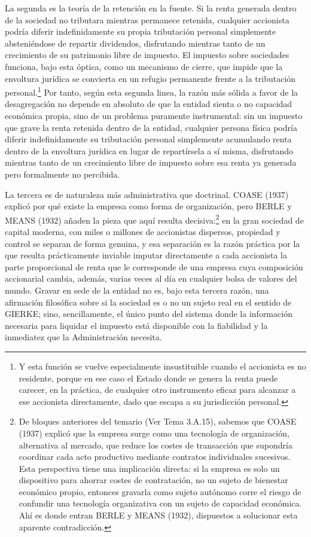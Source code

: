 \documentclass[10pt,a4paper]{article}
\newcommand{\authorfont}[1]{{\fontfamily{EBGaramond-TLF}\selectfont #1}}
\begin{document}
La segunda es la teoría de la retención en la fuente. Si la renta generada dentro de la sociedad no tributara mientras permanece retenida, cualquier accionista podría diferir indefinidamente su propia tributación personal simplemente absteniéndose de repartir dividendos, disfrutando mientras tanto de un crecimiento de su patrimonio libre de impuesto. El impuesto sobre sociedades funciona, bajo esta óptica, como un mecanismo de cierre, que impide que la envoltura jurídica se convierta en un refugio permanente frente a la tributación personal.\footnote{%
    Y esta función se vuelve especialmente insustituible cuando el accionista es no residente, porque en ese caso el Estado donde se genera la renta puede carecer, en la práctica, de cualquier otro instrumento eficaz para alcanzar a ese accionista directamente, dado que escapa a su jurisdicción personal.
} Por tanto, según esta segunda linea, la razón más sólida a favor de la desagregación no depende en absoluto de que la entidad sienta o no capacidad económica propia, sino de un problema puramente instrumental: sin un impuesto que grave la renta retenida dentro de la entidad, cualquier persona física podría diferir indefinidamente su tributación personal simplemente acumulando renta dentro de la envoltura jurídica en lugar de repartírsela a sí misma, disfrutando mientras tanto de un crecimiento libre de impuesto sobre esa renta ya generada pero formalmente no percibida.

La tercera es de naturaleza más administrativa que doctrinal. COASE (1937) explicó por qué existe la empresa como forma de organización, pero BERLE y MEANS (1932) añaden la pieza que aquí resulta decisiva:\footnote{%
    De bloques anteriores del temario (\authorfont{Ver Tema 3.A.15}), sabemos que COASE (1937) explicó que la empresa surge como una tecnología de organización, alternativa al mercado, que reduce los costes de transacción que supondría coordinar cada acto productivo mediante contratos individuales sucesivos. Esta perspectiva tiene una implicación directa: si la empresa es solo un dispositivo para ahorrar costes de contratación, no un sujeto de bienestar económico propio, entonces gravarla como sujeto autónomo corre el riesgo de confundir una tecnología organizativa con un sujeto de capacidad económica. Ahí es donde entran BERLE y MEANS (1932), dispuestos a solucionar esta aparente contradicción.
} en la gran sociedad de capital moderna, con miles o millones de accionistas dispersos, propiedad y control se separan de forma genuina, y esa separación es la razón práctica por la que resulta prácticamente inviable imputar directamente a cada accionista la parte proporcional de renta que le corresponde de una empresa cuya composición accionarial cambia, además, varias veces al día en cualquier bolsa de valores del mundo. Gravar en sede de la entidad no es, bajo esta tercera razón, una afirmación filosófica sobre si la sociedad es o no un sujeto real en el sentido de GIERKE; sino, sencillamente, el único punto del sistema donde la información necesaria para liquidar el impuesto está disponible con la fiabilidad y la inmediatez que la Administración necesita.
\end{document}
